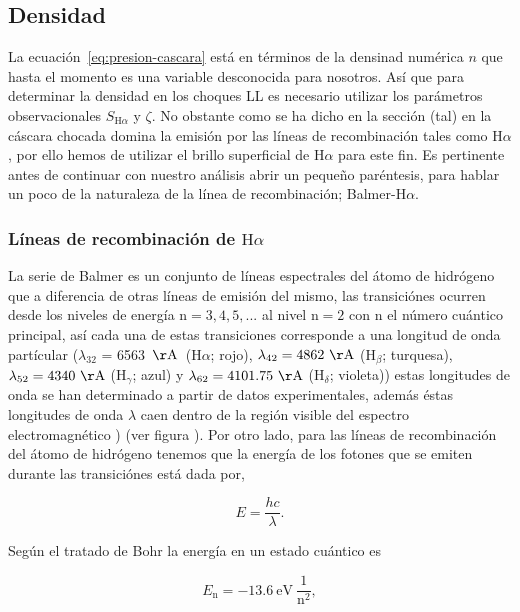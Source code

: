 \documentclass{article}
\newcommand\ha{\ensuremath{\mathrm{H}\alpha}}
\newcommand\A{\ensuremath{\mathrm{\AA{}}}}
\begin{document}
\subsection{Densidad }
\label{sec:densinty}

La ecuación~\ref{eq:presion-cascara} está en términos de la densinad numérica \(n\) que hasta el momento es una variable desconocida para nosotros. Así que para determinar la densidad en los choques LL es necesario utilizar los parámetros observacionales \(S_{\ha{}}\) y \(\zeta\). No obstante como se ha dicho en la sección (tal) en la cáscara chocada domina la emisión por las líneas de recombinación tales como \ha{}, por ello hemos de utilizar el brillo superficial de \ha{} para este fin. Es pertinente antes de continuar con nuestro análisis abrir un pequeño paréntesis, para hablar un poco de la naturaleza de la línea de recombinación; Balmer-\ha{}.\\

\subsubsection{Líneas de recombinación de \ha{}}
\label{sec:lines-ha}

La serie de Balmer es un conjunto de líneas espectrales del átomo de hidrógeno que a diferencia de otras líneas de emisión del mismo, las transiciónes ocurren desde los niveles de energía \(\text{n}= 3,4,5,...\) al nivel \(\text{n}=2\) con \(\text{n}\) el número cuántico principal, así cada una de estas transiciones corresponde a una longitud de onda partícular (\(\lambda_{32}\) = 6563~\A~(\ha{}; rojo), \(\lambda_{42} = 4862~\A{}\) (\(\text{H}_{\beta}\); turquesa), \(\lambda_{52} = 4340~\A{}\) (\(\text{H}_{\gamma}\); azul) y \(\lambda_{62} = 4101.75~\A{}\) (\(\text{H}_{\delta}\); violeta)) estas longitudes de onda se han determinado a partir de datos experimentales, además éstas longitudes de onda \(\lambda\) caen dentro de la región visible del espectro electromagnético \citep{Carroll:1996}) (ver figura ). Por otro lado, para las líneas de recombinación del átomo de hidrógeno tenemos que la energía de los fotones que se emiten durante las transiciónes está dada por,

\begin{equation}
  \label{eq:energy}
  E = \frac{hc}{\lambda}. 
\end{equation}
 
Según el tratado de Bohr la energía en un estado cuántico es

\begin{equation}
  \label{eq:quantum}
  E_{\text{n}} = -13.6~\text{eV}~\frac{1}{\text{n}^{2}},
\end{equation}
\end{document}
